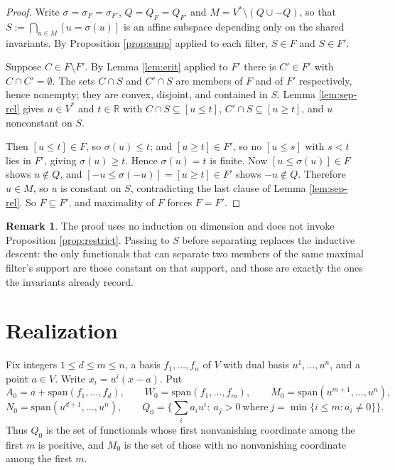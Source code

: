 \documentclass[11pt]{amsart}
\theoremstyle{plain}
\theoremstyle{definition}
\newtheorem{remark}[theorem]{Remark}
\newcommand{\RR}{\mathbb{R}}
\newcommand{\Vs}{V^{*}}
\begin{document}
\begin{proof}
Write $\sigma=\sigma_F=\sigma_{F'}$, $Q=Q_F=Q_{F'}$ and $M=\Vs\setminus(Q\cup-Q)$, so that $S:=\bigcap_{u\in M}[u=\sigma(u)]$ is an affine subspace depending only on the shared invariants. By Proposition \ref{prop:supp} applied to each filter, $S\in F$ and $S\in F'$.

Suppose $C\in F\setminus F'$. By Lemma \ref{lem:crit} applied to $F'$ there is $C'\in F'$ with $C\cap C'=\emptyset$. The sets $C\cap S$ and $C'\cap S$ are members of $F$ and of $F'$ respectively, hence nonempty; they are convex, disjoint, and contained in $S$. Lemma \ref{lem:sep-rel} gives $u\in\Vs$ and $t\in\RR$ with $C\cap S\subseteq[u\le t]$, $C'\cap S\subseteq[u\ge t]$, and $u$ nonconstant on $S$.

Then $[u\le t]\in F$, so $\sigma(u)\le t$; and $[u\ge t]\in F'$, so no $[u\le s]$ with $s<t$ lies in $F'$, giving $\sigma(u)\ge t$. Hence $\sigma(u)=t$ is finite. Now $[u\le\sigma(u)]\in F$ shows $u\notin Q$, and $[-u\le\sigma(-u)]=[u\ge t]\in F'$ shows $-u\notin Q$. Therefore $u\in M$, so $u$ is constant on $S$, contradicting the last clause of Lemma \ref{lem:sep-rel}. So $F\subseteq F'$, and maximality of $F$ forces $F=F'$.
\end{proof}

\begin{remark}
The proof uses no induction on dimension and does not invoke Proposition \ref{prop:restrict}. Passing to $S$ before separating replaces the inductive descent: the only functionals that can separate two members of the same maximal filter's support are those constant on that support, and those are exactly the ones the invariants already record.
\end{remark}

\section{Realization}\label{sec:realize}

Fix integers $1\le d\le m\le n$, a basis $f_1,\dots,f_n$ of $V$ with dual basis $u^{1},\dots,u^{n}$, and a point $a\in V$. Write $x_i=u^{i}(x-a)$. Put
\[
A_0=a+\mathrm{span}(f_1,\dots,f_d),\qquad
W_0=\mathrm{span}(f_1,\dots,f_m),\qquad
M_0=\mathrm{span}(u^{m+1},\dots,u^{n}),
\]
\[
N_0=\mathrm{span}(u^{d+1},\dots,u^{n}),\qquad
Q_0=\Big\{\textstyle\sum_i a_iu^{i}:\ a_j>0\ \text{where}\ j=\min\{i\le m:a_i\neq0\}\Big\}.
\]
Thus $Q_0$ is the set of functionals whose first nonvanishing coordinate among the first $m$ is positive, and $M_0$ is the set of those with no nonvanishing coordinate among the first $m$.
\end{document}
